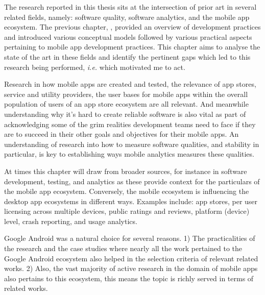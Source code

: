 The research reported in this thesis sits at the intersection of prior art in several related fields, namely: software quality, software analytics, and the mobile app ecosystem. %
The previous chapter, , provided an overview of development practices and introduced various conceptual models followed by various practical aspects pertaining to mobile app development practices.  
This chapter aims to analyse the state of the art in these fields and identify the pertinent gaps which led to this research being performed, \emph{i.e.} which motivated me to act.  

Research in how mobile apps are created and tested, the relevance of app stores, service and utility providers, the user bases for mobile apps within the overall population of users of an app store ecosystem are all relevant. And meanwhile understanding why it's hard to create reliable software is also vital as part of acknowledging some of the grim realities development teams need to face if they are to succeed in their other goals and objectives for their mobile apps. An understanding of research into how to measure software qualities, and stability in particular, is key to establishing ways mobile analytics measures these qualities. 

At times this chapter will draw from broader sources, for instance in software development, testing, and analytics as these provide context for the particulars of the mobile app ecosystem. Conversely, the mobile ecosystem is influencing the desktop app ecosystems in different ways. 
Examples include: app stores, per user licensing across multiple devices, public ratings and reviews, platform (device) level, crash reporting, and usage analytics.


Google Android was a natural choice for several reasons. 1) The practicalities of the research and the case studies where nearly all the work pertained to the Google Android ecosystem also helped in the selection criteria of relevant related works. 2) Also, the vast majority of active research in the domain of mobile apps also pertains to this ecosystem, this means the topic is richly served in terms of related works.

